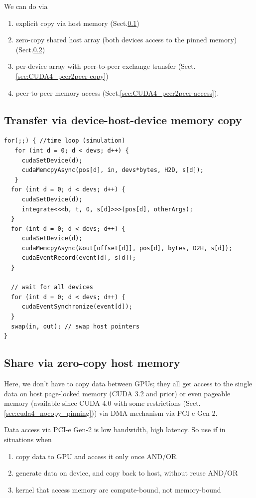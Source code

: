We can do via
\begin{enumerate}
  \item explicit copy via host memory (Sect.\ref{sec:GPUs_shared-host-mem})
  \item zero-copy shared host array (both devices access to the pinned memory)
  (Sect.\ref{sec:CUDA4_share_zero-copy})
  \item per-device array with peer-to-peer exchange transfer
  (Sect.\ref{sec:CUDA4_peer2peer-copy})
  \item peer-to-peer memory access (Sect.\ref{sec:CUDA4_peer2peer-access}).
\end{enumerate}

\subsection{Transfer via device-host-device memory copy}
\label{sec:GPUs_shared-host-mem}

\begin{lstlisting}
for(;;) { //time loop (simulation)
   for (int d = 0; d < devs; d++) {
     cudaSetDevice(d);
     cudaMemcpyAsync(pos[d], in, devs*bytes, H2D, s[d]);
   }
  for (int d = 0; d < devs; d++) {
     cudaSetDevice(d);
     integrate<<<b, t, 0, s[d]>>>(pos[d], otherArgs);
  }
  for (int d = 0; d < devs; d++) {
     cudaSetDevice(d);
     cudaMemcpyAsync(&out[offset[d]], pos[d], bytes, D2H, s[d]);
     cudaEventRecord(event[d], s[d]);
  }
  
  // wait for all devices
  for (int d = 0; d < devs; d++) {
     cudaEventSynchronize(event[d]);
  }
  swap(in, out); // swap host pointers
}
\end{lstlisting}

\subsection{Share via zero-copy host memory}
\label{sec:CUDA4_share_zero-copy}

Here, we don't have to copy data between GPUs; they all get access to the single
data on host page-locked memory (CUDA 3.2 and prior) or even pageable memory
(available since CUDA 4.0 with some restrictions (Sect.\ref{sec:cuda4_nocopy_pinning})) via
DMA mechanism via PCI-e Gen-2.

Data access via PCI-e Gen-2 is low bandwidth, high latency. So use if in
situations when
\begin{enumerate}
  \item copy data to GPU and access it only once AND/OR
  \item generate data on device, and copy back to host, without reuse AND/OR
  \item kernel that access memory are compute-bound, not memory-bound
\end{enumerate}


